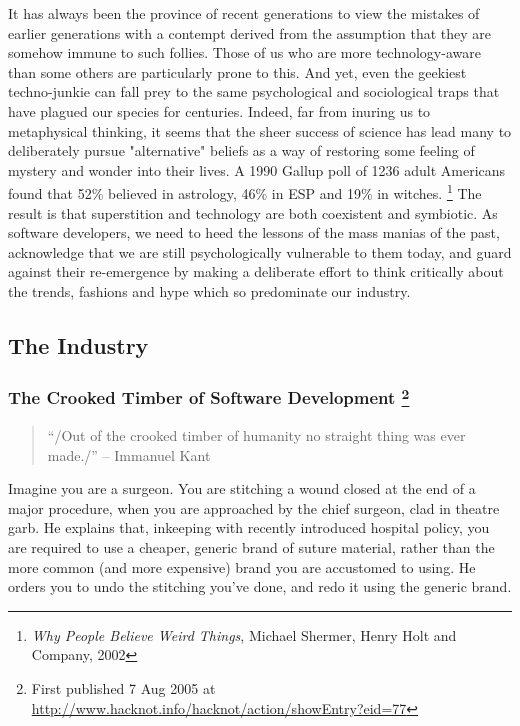 \documentclass{article}
\begin{document}
\begin{enumerate}
It has always been the province of recent generations to view the
mistakes of earlier generations with a contempt derived from the
assumption that they are somehow immune to such follies. Those of us who
are more technology-aware than some others are particularly prone to
this. And yet, even the geekiest techno-junkie can fall prey to the same
psychological and sociological traps that have plagued our species for
centuries. Indeed, far from inuring us to metaphysical thinking, it
seems that the sheer success of science has lead many to deliberately
pursue "alternative" beliefs as a way of restoring some feeling of
mystery and wonder into their lives. A 1990 Gallup poll of 1236 adult
Americans found that 52\% believed in astrology, 46\% in ESP and 19\% in
witches. \footnote{\emph{Why People Believe Weird Things}, Michael Shermer, Henry Holt and
Company, 2002} The result is that superstition and technology are both
coexistent and symbiotic. As software developers, we need to heed the
lessons of the mass manias of the past, acknowledge that we are still
psychologically vulnerable to them today, and guard against their
re-emergence by making a deliberate effort to think critically about the
trends, fashions and hype which so predominate our industry.
\end{enumerate}

\subsection{The Industry}
\label{sec:orgheadline422}

\subsubsection{The Crooked Timber of Software Development \footnote{First published 7 Aug 2005 at
\url{http://www.hacknot.info/hacknot/action/showEntry?eid=77}}}
\label{sec:orgheadline408}

\begin{quote}
“/Out of the crooked timber of humanity no straight thing was ever
made./” -- Immanuel Kant
\end{quote}

Imagine you are a surgeon. You are stitching a wound closed at the end
of a major procedure, when you are approached by the chief surgeon, clad
in theatre garb. He explains that, inkeeping with recently introduced
hospital policy, you are required to use a cheaper, generic brand of
suture material, rather than the more common (and more expensive) brand
you are accustomed to using. He orders you to undo the stitching you've
done, and redo it using the generic brand.
\end{document}
